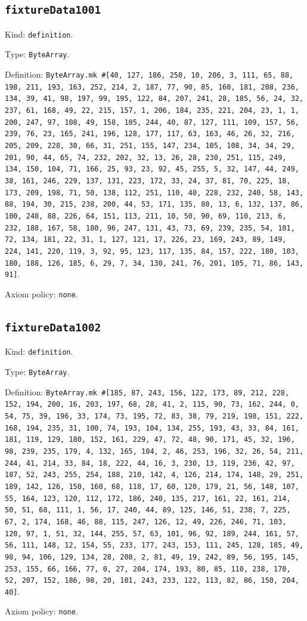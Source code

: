\documentclass[11pt]{article}
\begin{document}
\subsection*{\texttt{fixtureData1001}}
\noindent Kind: \texttt{definition}.\par
\noindent Type: \texttt{ByteArray}.\par
\noindent Definition: \texttt{ByteArray.mk \#[40, 127, 186, 250, 10, 206, 3, 111, 65, 88, 198, 211, 193, 163, 252, 214, 2, 187, 77, 90, 85, 160, 181, 208, 236, 134, 39, 41, 98, 197, 99, 195, 122, 84, 207, 241, 28, 185, 56, 24, 32, 237, 61, 168, 49, 22, 215, 157, 1, 206, 184, 235, 221, 204, 23, 1, 1, 200, 247, 97, 108, 49, 158, 105, 244, 40, 87, 127, 111, 109, 157, 56, 239, 76, 23, 165, 241, 196, 128, 177, 117, 63, 163, 46, 26, 32, 216, 205, 209, 228, 30, 66, 31, 251, 155, 147, 234, 105, 108, 34, 34, 29, 201, 90, 44, 65, 74, 232, 202, 32, 13, 26, 28, 230, 251, 115, 249, 134, 150, 104, 71, 166, 25, 93, 23, 92, 45, 255, 5, 32, 147, 44, 249, 38, 161, 246, 229, 137, 131, 223, 172, 33, 24, 37, 81, 70, 225, 18, 173, 209, 198, 71, 50, 138, 112, 251, 110, 40, 228, 232, 240, 58, 143, 88, 194, 30, 215, 238, 200, 44, 53, 171, 135, 80, 13, 6, 132, 137, 86, 100, 248, 88, 226, 64, 151, 113, 211, 10, 50, 90, 69, 110, 213, 6, 232, 188, 167, 58, 180, 96, 247, 131, 43, 73, 69, 239, 235, 54, 101, 72, 134, 181, 22, 31, 1, 127, 121, 17, 226, 23, 169, 243, 89, 149, 224, 141, 220, 119, 3, 92, 95, 123, 117, 135, 84, 157, 222, 180, 103, 180, 188, 126, 185, 6, 29, 7, 34, 130, 241, 76, 201, 105, 71, 86, 143, 91]}.\par
\noindent Axiom policy: \texttt{none}.\par
\subsection*{\texttt{fixtureData1002}}
\noindent Kind: \texttt{definition}.\par
\noindent Type: \texttt{ByteArray}.\par
\noindent Definition: \texttt{ByteArray.mk \#[185, 87, 243, 156, 122, 173, 89, 212, 228, 152, 194, 200, 16, 203, 197, 68, 28, 41, 2, 115, 90, 73, 162, 244, 0, 54, 75, 39, 196, 33, 174, 73, 195, 72, 83, 38, 79, 219, 198, 151, 222, 168, 194, 235, 31, 100, 74, 193, 104, 134, 255, 193, 43, 33, 84, 161, 181, 119, 129, 180, 152, 161, 229, 47, 72, 48, 90, 171, 45, 32, 196, 98, 239, 235, 179, 4, 132, 165, 104, 2, 46, 253, 196, 32, 26, 54, 211, 244, 41, 214, 33, 84, 18, 222, 44, 16, 3, 230, 13, 119, 236, 42, 97, 187, 52, 243, 255, 254, 188, 210, 142, 4, 126, 214, 174, 148, 29, 251, 189, 142, 126, 150, 160, 68, 118, 17, 60, 120, 179, 21, 56, 148, 107, 55, 164, 123, 120, 112, 172, 186, 240, 135, 217, 161, 22, 161, 214, 50, 51, 68, 111, 1, 56, 17, 240, 44, 89, 125, 146, 51, 238, 7, 225, 67, 2, 174, 168, 46, 88, 115, 247, 126, 12, 49, 226, 246, 71, 103, 120, 97, 1, 51, 32, 144, 255, 57, 63, 101, 96, 92, 189, 244, 161, 57, 56, 111, 148, 12, 154, 55, 233, 177, 243, 153, 111, 245, 128, 185, 49, 98, 94, 106, 129, 134, 28, 208, 2, 81, 49, 19, 242, 89, 56, 195, 145, 253, 155, 66, 166, 77, 0, 27, 204, 174, 193, 80, 85, 110, 238, 170, 52, 207, 152, 186, 98, 20, 101, 243, 233, 122, 113, 82, 86, 150, 204, 40]}.\par
\noindent Axiom policy: \texttt{none}.\par
\end{document}
